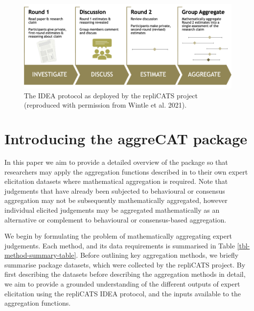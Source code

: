 \documentclass[article]{jss}
\begin{document}
\begin{figure}

{\centering \includegraphics{images/img_IDEA_repliCATS.png}

}

\caption{The IDEA protocol as deployed by the repliCATS project
(reproduced with permission from Wintle et al. 2021).}

\end{figure}

\hypertarget{introducing-the-aggrecat-package}{%
\section{Introducing the aggreCAT
package}\label{introducing-the-aggrecat-package}}

In this paper we aim to provide a detailed overview of the
 package so that researchers may apply the aggregation
functions described in \citep{Hanea2021} to their own expert elicitation
datasets where mathematical aggregation is required. Note that
judgements that have already been subjected to behavioural or consensus
aggregation may not be subsequently mathematically aggregated, however
individual elicited judgements may be aggregated mathematically as an
alternative or complement to behavioural or consensus-based aggregation.

We begin by formulating the problem of mathematically aggregating expert
judgements. Each method, and its data requirements is summarised in
Table \ref{tbl-method-summary-table}. Before outlining key aggregation
methods, we briefly summarise package datasets, which were collected by
the repliCATS project. By first describing the datasets before
describing the aggregation methods in detail, we aim to provide a
grounded understanding of the different outputs of expert elicitation
using the repliCATS IDEA protocol, and the inputs available to the
aggregation functions.
\end{document}

